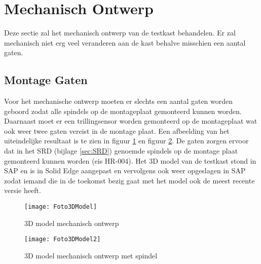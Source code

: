 \section{Mechanisch Ontwerp}

Deze sectie zal het mechanisch ontwerp van de testkast behandelen. Er zal mechanisch niet erg veel veranderen aan de kast behalve misschien een aantal gaten.

\subsection{Montage Gaten}

Voor het mechanische ontwerp moeten er slechts een aantal gaten worden geboord zodat alle spindels op de montageplaat gemonteerd kunnen worden. Daarnaast moet er een trillingsensor worden gemonteerd op de montageplaat wat ook weer twee gaten vereist in de montage plaat. Een afbeelding van het uiteindelijke resultaat is te zien in figuur \ref{fig:MechanischOntwerp} en figuur \ref{fig:MechanischOntwerp2}. De gaten zorgen ervoor dat in het \gls{SRD} (bijlage \ref{sec:SRD}) genoemde spindels op de montage plaat gemonteerd kunnen worden (eis HR-004). Het 3D model van de testkast stond in \gls{SAP} en is in Solid Edge aangepast en vervolgens ook weer opgeslagen in \gls{SAP} zodat iemand die in de toekomst bezig gaat met het model ook de meest recente versie heeft.

\begin{figure}[H]
	\centering
	\texttt{[image: Foto3DModel]}
	\caption{3D model mechanisch ontwerp}
	\label{fig:MechanischOntwerp}
\end{figure}

\begin{figure}[H]
	\centering
	\texttt{[image: Foto3DModel2]}
	\caption{3D model mechanisch ontwerp met spindel}
	\label{fig:MechanischOntwerp2}
\end{figure}